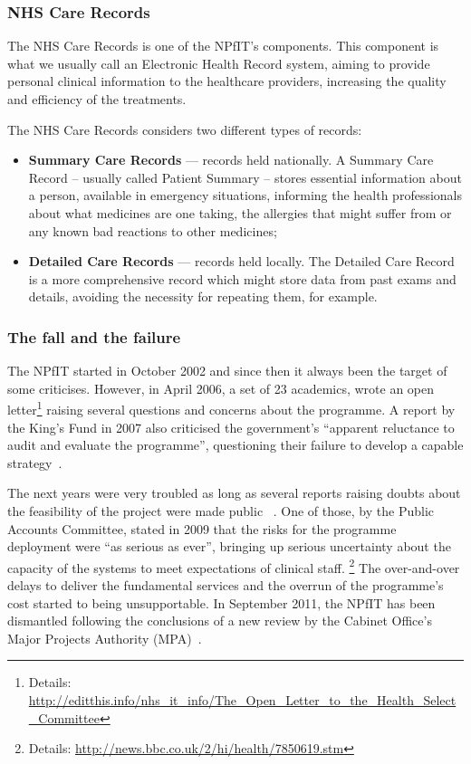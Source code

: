 \subsubsection{NHS Care Records}
The NHS Care Records is one of the NPfIT's components. This component is what we usually call an Electronic Health Record system, aiming to provide personal clinical information to the healthcare providers, increasing the quality and efficiency of the treatments.

The NHS Care Records considers two different types of records:
\begin{itemize}
\item \textbf{Summary Care Records} --- records held nationally. A Summary Care Record -- usually called Patient Summary -- stores essential information about a person, available in emergency situations, informing the health professionals about what medicines are one taking, the allergies that might suffer from or any known bad reactions to other medicines;
\item \textbf{Detailed Care Records} --- records held locally. The Detailed Care Record is a more comprehensive record which might store data from past exams and details, avoiding the necessity for repeating them, for example.
\end{itemize} 


\subsubsection{The fall and the failure}
The NPfIT started in October 2002 and since then it always been the target of some criticises. However, in April 2006, a set of 23 academics, wrote an open letter\footnote{Details: \url{http://editthis.info/nhs_it_info/The_Open_Letter_to_the_Health_Select_Committee}} raising several questions and concerns about the programme. A report by the King's Fund in 2007 also criticised the government's ``apparent reluctance to audit and evaluate the programme'', questioning their failure to develop a capable strategy~\citep{Wanless2007}.

The next years were very troubled as long as several reports raising doubts about the feasibility of the project were made public ~\citep{Powell2004,Coiera2007,Brennan2007,Clegg2007,Brennan2009}. One of those, by the Public Accounts Committee, stated in 2009 that the risks for the programme deployment were ``as serious as ever'', bringing up serious uncertainty about the capacity of the systems to meet expectations of clinical staff. \footnote{Details: \url{http://news.bbc.co.uk/2/hi/health/7850619.stm}} The over-and-over delays to deliver the fundamental services and the overrun of the programme's cost started to being unsupportable. In September 2011, the NPfIT has been dismantled following the conclusions of a new review by the Cabinet Office's Major Projects Authority (MPA)~\citep{OfHealth}.








